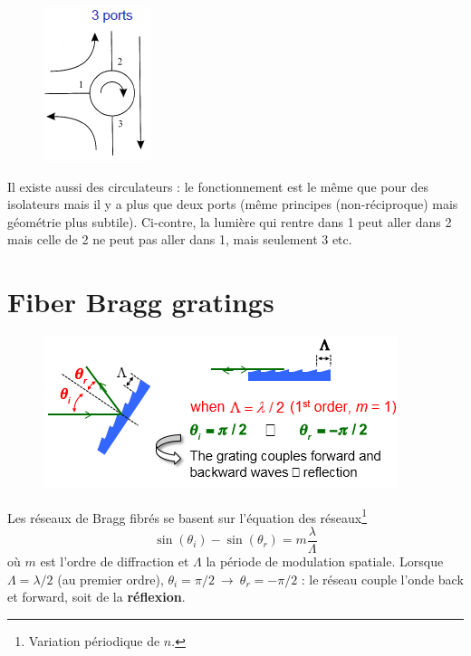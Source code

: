 	\begin{figure}
	\vspace{-10mm}
	\includegraphics[scale=0.6]{ch3/image8}
	\end{figure}
Il existe aussi des circulateurs : le fonctionnement est le même que pour des isolateurs mais
il y a plus que deux ports (même principes (non-réciproque) mais géométrie plus subtile). Ci-contre,
la lumière qui rentre dans 1 peut aller dans 2 mais celle de 2 ne peut pas aller dans 1, mais 
seulement 3 etc.



\section{Fiber Bragg gratings}

	\begin{figure}
	\includegraphics[scale=0.6]{ch3/image9}
	\end{figure}
Les réseaux de Bragg fibrés se basent sur l'équation des réseaux\footnote{Variation périodique de 
$n$.}
\begin{equation}
\sin ({\theta _i}) - \sin ({\theta _r}) = m\frac{\lambda }{\Lambda }
\end{equation}
où $m$ est l'ordre de diffraction et $\Lambda$ la période de modulation spatiale. 
Lorsque $\Lambda=\lambda/2$ (au premier ordre), $\theta_i=\pi/2\ \to\ \theta_r = -\pi/2$ : le 
réseau couple l'onde back et forward, soit de la \textbf{réflexion}.\\


